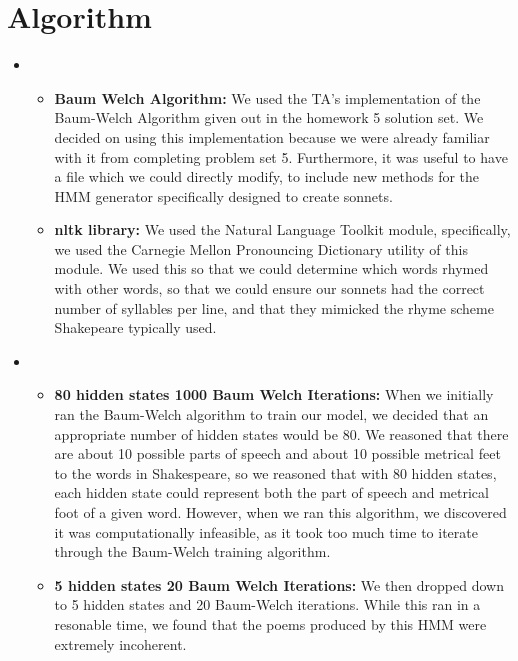 \section{Algorithm}
\medskip
\begin{itemize}

    \item {}
    \begin{itemize}
    \item \textbf{Baum Welch Algorithm:} We used the TA's implementation of the Baum-Welch Algorithm given out in the homework 5 solution set. We decided on using this implementation because we were already familiar with it from completing problem set 5. Furthermore, it was useful to have a file which we could directly modify, to include new methods for the HMM generator specifically designed to create sonnets.

    \item \textbf{nltk library:} We used the Natural Language Toolkit module, specifically, we used the Carnegie Mellon Pronouncing Dictionary utility of this module. We used this so that we could determine which words rhymed with other words, so that we could ensure our sonnets had the correct number of syllables per line, and that they mimicked the rhyme scheme Shakepeare typically used.
    \end{itemize}

    \item {}

    \begin{itemize}
    \item \textbf{80 hidden states 1000 Baum Welch Iterations:} When we initially ran the Baum-Welch algorithm to train our model, we decided that an appropriate number of hidden states would be 80. We reasoned that there are about 10 possible parts of speech and about 10 possible metrical feet to the words in Shakespeare, so we reasoned that with 80 hidden states, each hidden state could represent both the part of speech and metrical foot of a given word. However, when we ran this algorithm, we discovered it was computationally infeasible, as it took too much time to iterate through the Baum-Welch training algorithm.

    \item \textbf{5 hidden states 20 Baum Welch Iterations:} We then dropped down to 5 hidden states and 20 Baum-Welch iterations. While this ran in a resonable time, we found that the poems produced by this HMM were extremely incoherent.


\end{itemize}
\end{itemize}
